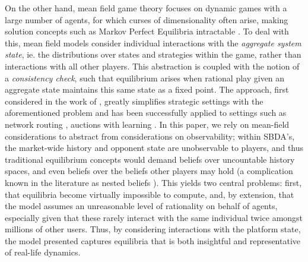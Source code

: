 On the other hand, mean field game theory focuses on dynamic games with a large number of agents, for which curses of dimensionality often arise, making solution concepts such as Markov Perfect Equilibria intractable \citep{maskin2001markov}. To deal with this, mean field models consider individual interactions with the \textit{aggregate system state}, ie. the distributions over states and strategies within the game, rather than interactions with all other players. This abstraction is coupled with the notion of a \textit{consistency check}, such that equilibrium arises when rational play given an aggregate state maintains this same state as a fixed point. The approach, first considered in the work of \cite{jovanovic1988anonymous}, greatly simplifies strategic settings with the aforementioned problem and has been successfully applied to settings such as network routing \citep{calderone2017markov}, auctions with learning \citep{iyer2014mean}. In this paper, we rely on mean-field considerations to abstract from considerations on observability; within SBDA's, the market-wide history and opponent state are unobservable to players, and thus traditional equilibrium concepts would demand beliefs over uncountable history spaces, and even beliefs over the beliefs other players may hold (a complication known in the literature as nested beliefs \citep{brandenburger1993hierarchies}). This yields two central problems: first, that equilibria become virtually impossible to compute, and, by extension, that the model assumes an unreasonable level of rationality on behalf of agents, especially given that these rarely interact with the same individual twice amongst millions of other users. Thus, by considering interactions with the platform state, the model presented captures equilibria that is both insightful and representative of real-life dynamics.


